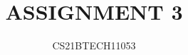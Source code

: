 \documentclass[journal,12pt,twocolumn]{IEEEtran}
\begin{document}
\makeatletter
{}
\makeatother
\let\StandardTheFigure\thefigure
\let\vec\mathbf
\renewcommand{\thefigure}{\theproblem}

\title{ASSIGNMENT 3}
\author{CS21BTECH11053}

%
%
%
% 
%
\end{document}
